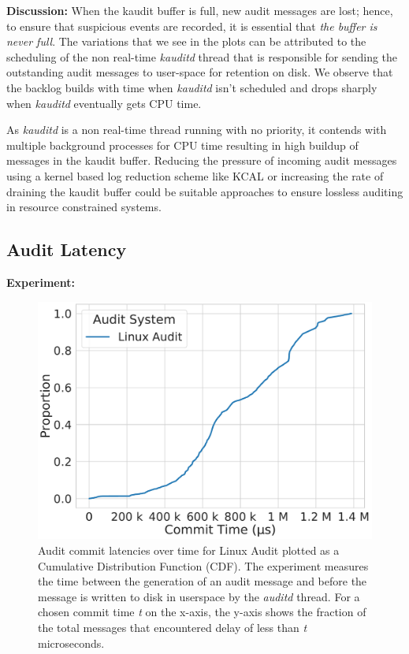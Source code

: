 \textbf{Discussion:}
When the kaudit buffer is full, new audit messages are lost; hence, to ensure that suspicious events are recorded, it is essential that \textit{the buffer is never full}.
The variations that we see in the plots can be attributed to the scheduling of the non real-time \textit{kauditd} thread that is responsible for sending the outstanding audit messages to user-space for retention on disk. We observe that the backlog builds with time when \textit{kauditd} isn't scheduled and drops sharply when \textit{kauditd} eventually gets CPU time. 

As \textit{kauditd} is a non real-time thread running with no priority, it contends with multiple background processes for CPU time resulting in high buildup of messages in the kaudit buffer. Reducing the pressure of incoming audit messages using a kernel based log reduction scheme like KCAL \cite{Ma2018} or increasing the rate of draining the kaudit buffer could be suitable approaches to ensure lossless auditing in resource constrained systems.

\subsection{Audit Latency}
\textbf{Experiment:}

\begin{figure}[tbp]
    \centering
    \includegraphics[width=0.9\linewidth,keepaspectratio,scale=0.9]{fig/Commit_latencies_cdf.pdf}
    \caption{\label{fig:eval_latency}Audit commit latencies over time for Linux Audit plotted as a Cumulative Distribution Function (CDF). The experiment measures the time between the generation of an audit message and before the message is written to disk in userspace by the \textit{auditd} thread. For a chosen commit time \textit{t} on the x-axis, the y-axis shows the fraction of the total messages that encountered delay of less than \textit{t} microseconds.}
\end{figure}

